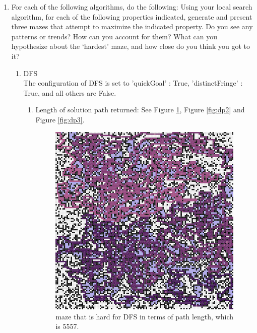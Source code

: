 \documentclass[letter]{article}
\begin{document}
\begin{enumerate}[resume]
		\item {For each of the following algorithms, do the following: Using your local search algorithm, for each of the following properties indicated, generate and present three mazes that attempt to maximize the indicated property. Do you see any patterns or trends? How can you account for them? What can you hypothesize about the ‘hardest’ maze, and how close do you think you got to it?}
		\begin{enumerate}
			\item {DFS} \\
			\label{DFS}
			The configuration of DFS is set to 'quickGoal' : True, 'distinctFringe' : True, and all others are False.
			\begin{enumerate}
				\item {Length of solution path returned: See Figure \ref{fig:dp1}, Figure \ref{fig:dp2} and Figure \ref{fig:dp3}.} \\
				\begin{figure}
					\minipage{\textwidth}
					
						\includegraphics[width=\textwidth]{../pics/dp/5557.png}
						\caption{\label{fig:dp1}maze that is hard for DFS in terms of path length, which is 5557.}
						

\end{figure}
\end{enumerate}
\end{enumerate}
\end{enumerate}
\end{document}
